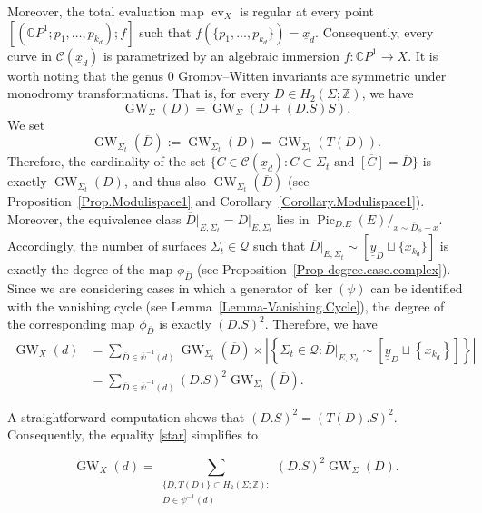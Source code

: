 \documentclass[11pt]{amsart}
\numberwithin{equation}{section}
\theoremstyle{definition}
\theoremstyle{plain}
\theoremstyle{remark}
\newcommand{\Z}{\mathbb{Z}}
\newcommand{\C}{\mathbb{C}}
\DeclareMathOperator{\GW}{GW}
\DeclareMathOperator{\Pic}{Pic}
\DeclareMathOperator{\ev}{ev}
\begin{document}
 Moreover, the total evaluation map  $\ev_{X}$ is regular at every point $[(\C P^1;p_1,\ldots,p_{k_d});f]$ such that $f(\{p_1,\ldots,p_{k_d}\})=\underline{x}_d$. Consequently, every curve in $\mathcal{C}({\underline{x}_d})$  is parametrized by an algebraic immersion $f\colon \mathbb{C}P^1\to X$. It is worth noting that the genus $0$ Gromov--Witten invariants are symmetric under mono\-dromy transformations. That is, for every $D\in H_2(\Sigma;\Z)$, we have
  $$\GW_{\Sigma}(D)=\GW_{\Sigma}(D+(D.S)S).$$
 We set
 $$\GW_{\Sigma_t}(\overline{D}):= \GW_{\Sigma_t}(D)=\GW_{\Sigma_t}(T(D)).$$
 Therefore, the cardinality of the set  $\{C\in \mathcal{C}(\underline{x}_d): C \subset \Sigma_t \text{ and } \overline{[C]}=\overline{D} \}$  is exactly $\GW_{\Sigma_t}({D})$, and thus also $\GW_{\Sigma_t}(\overline{D})$  (see Proposition~\ref{Prop.Modulispace1} and Corollary~\ref{Corollary.Modulispace1}).  Moreover, the equivalence class $\overline{D}|_{E,\Sigma_t}=\overline{D|_{E,\Sigma_t}}$ lies in $\Pic_{D.E} (E)/_{x\sim \overline{D}_{\phi}-x}$. Accordingly, the number of surfaces $\Sigma_t\in\mathcal{Q}$ such that $\overline{D}|_{E,\Sigma_t}\sim [\underline{y}_D\sqcup \{x_{k_d}\}]$ is exactly the degree of  the map  $\phi_{\overline{D}}$ (see  Proposition~\ref{Prop-degree.case.complex}). Since we are considering cases in which a generator of $\ker (\psi)$ can be identified with the vanishing cycle (see Lemma~\ref{Lemma-Vanishing.Cycle}), the degree of the corresponding map  $\phi_{\overline{D}}$ is exactly $(D.S)^2$. Therefore, we have 
\begin{equation}\tag{$\star$}\label{star}
     \begin{aligned}
        \GW_X(d) &=\sum_{\overline{D}\in \overline{\psi}^{-1}(d)} \GW_{\Sigma_t}\left(\overline{D}\right) \times  \left|\left\{\Sigma_t\in\mathcal{Q}: \overline{D}|_{E,\Sigma_t}\sim \left[\underline{y}_D\sqcup \left\{x_{k_d}\right\}\right]\right\}\right| \\
       &=\sum_{\overline{D}\in \overline{\psi}^{-1}(d)}  (D.S)^2 \GW_{\Sigma_t}\left(\overline{D}\right).
    \end{aligned}
\end{equation}
   

 
    
A straightforward computation shows that $(D.S)^2=(T(D).S)^2$. Consequently, the equality \eqref{star} simplifies to
 
$$ 
    \GW_X(d)=\sum_{\substack{\{D,T(D)\}\subset H_2(\Sigma;\Z):\\D\in \psi^{-1}(d)}
      }(D.S)^2 \GW_{\Sigma}(D).$$
      
\end{document}
